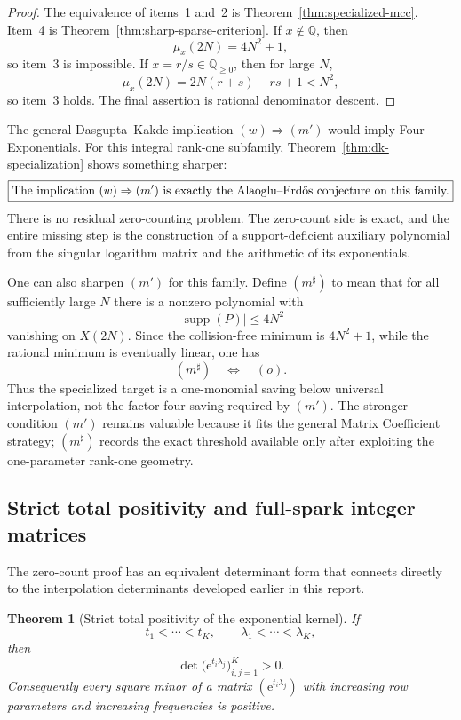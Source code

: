 \documentclass[11pt,oneside]{article}
\newtheorem{theorem}{Theorem}[section]
\theoremstyle{definition}
\theoremstyle{remark}
\newcommand{\Q}{\mathbb Q}
\newcommand{\supp}{\operatorname{supp}}
\newcommand{\ee}{\mathrm e}
\begin{document}
\begin{proof}
The equivalence of items~1 and~2 is Theorem~\ref{thm:specialized-mcc}.  Item~4 is
Theorem~\ref{thm:sharp-sparse-criterion}.  If $x\notin\Q$, then
\[
  \mu_x(2N)=4N^2+1,
\]
so item~3 is impossible.  If $x=r/s\in\Q_{\ge0}$, then for large $N$,
\[
  \mu_x(2N)=2N(r+s)-rs+1<N^2,
\]
so item~3 holds.  The final assertion is rational denominator descent.
\end{proof}

The general Dasgupta--Kakde implication $(w)\Rightarrow(m')$ would imply Four Exponentials.
For this integral rank-one subfamily, Theorem~\ref{thm:dk-specialization} shows something
sharper:
\[
  \boxed{\text{The implication $(w)\Rightarrow(m')$ is exactly the
  Alaoglu--Erd\H{o}s conjecture on this family.}}
\]
There is no residual zero-counting problem.  The zero-count side is exact, and the entire
missing step is the construction of a support-deficient auxiliary polynomial from the
singular logarithm matrix and the arithmetic of its exponentials.

One can also sharpen $(m')$ for this family.  Define $(m^{\sharp})$ to mean that for all
sufficiently large $N$ there is a nonzero polynomial with
\[
  |\supp(P)|\le4N^2
\]
vanishing on $X(2N)$.  Since the collision-free minimum is $4N^2+1$, while the rational
minimum is eventually linear, one has
\[
  (m^{\sharp})\quad\Longleftrightarrow\quad(o).
\]
Thus the specialized target is a one-monomial saving below universal interpolation, not the
factor-four saving required by $(m')$.  The stronger condition $(m')$ remains valuable
because it fits the general Matrix Coefficient strategy; $(m^{\sharp})$ records the exact
threshold available only after exploiting the one-parameter rank-one geometry.

\subsection{Strict total positivity and full-spark integer matrices}
\label{sec:sparse-total-positive}

The zero-count proof has an equivalent determinant form that connects directly to the
interpolation determinants developed earlier in this report.

\begin{theorem}[Strict total positivity of the exponential kernel]
\label{thm:exp-total-positive}
If
\[
  t_1<\cdots<t_K,
  \qquad
  \lambda_1<\cdots<\lambda_K,
\]
then
\[
  \det\bigl(\ee^{t_i\lambda_j}\bigr)_{i,j=1}^K>0.
\]
Consequently every square minor of a matrix
$(\ee^{t_i\lambda_j})$ with increasing row parameters and increasing frequencies is
positive.
\end{theorem}
\end{document}
